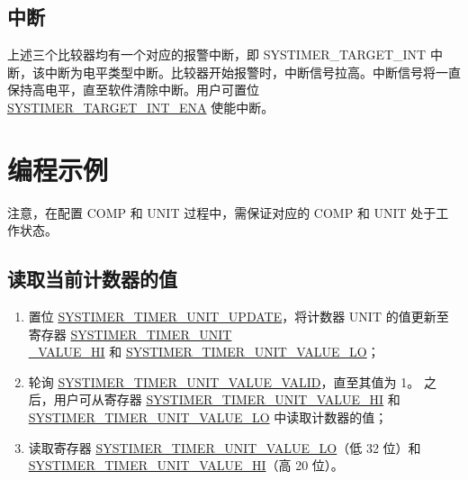 \documentclass[main\_\_CN.tex]{subfiles}
\begin{document}
\subsection{中断}
上述三个比较器均有一个对应的报警中断，即 SYSTIMER\_TARGET\_INT 中断，该中断为电平类型中断。比较器开始报警时，中断信号拉高。中断信号将一直保持高电平，直至软件清除中断。用户可置位 \hyperref[fielddesc:SYSTIMERTARGET0INTENA]{SYSTIMER\_TARGET\_INT\_ENA} 使能中断。


\section{编程示例}\label{sec:instructions-of-usage}
注意，在配置 COMP 和 UNIT 过程中，需保证对应的 COMP 和 UNIT 处于工作状态。
\subsection{读取当前计数器的值}\label{sec:to-read-system-timer-value}
\begin{enumerate}
    \item 置位 \hyperref[fielddesc:SYSTIMERTIMERUNIT0UPDATE]{SYSTIMER\_TIMER\_UNIT\_UPDATE}，将计数器 UNIT 的值更新至寄存器 \hyperref[fielddesc:SYSTIMERTIMERUNIT0VALUEHI]{SYSTIMER\_TIMER\_UNIT\\\_VALUE\_HI} 和 \hyperref[fielddesc:SYSTIMERTIMERUNIT0VALUELO]{SYSTIMER\_TIMER\_UNIT\_VALUE\_LO}；
    \item 轮询 \hyperref[fielddesc:SYSTIMERTIMERUNIT0VALUEVALID]{SYSTIMER\_TIMER\_UNIT\_VALUE\_VALID}，直至其值为 1。
    之后，用户可从寄存器 \hyperref[fielddesc:SYSTIMERTIMERUNIT0VALUEHI]{SYSTIMER\_TIMER\_UNIT\_VALUE\_HI} 和 \hyperref[fielddesc:SYSTIMERTIMERUNIT0VALUELO]{SYSTIMER\_TIMER\_UNIT\_VALUE\_LO} 中读取计数器的值；
    \item 读取寄存器 \hyperref[fielddesc:SYSTIMERTIMERUNIT0VALUELO]{SYSTIMER\_TIMER\_UNIT\_VALUE\_LO}（低 32 位）和 \hyperref[fielddesc:SYSTIMERTIMERUNIT0VALUEHI]{SYSTIMER\_TIMER\_UNIT\_VALUE\_HI}（高 20 位）。
\end{enumerate}
\end{document}
